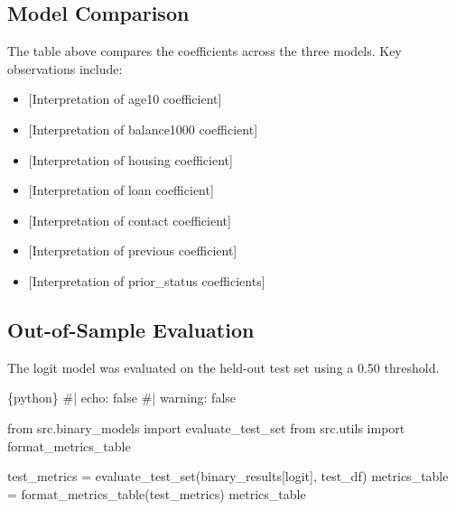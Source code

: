 \documentclass[
  letterpaper,
  DIV=11,
  numbers=noendperiod]{scrartcl}
\newenvironment{Shaded}{\begin{snugshade}}{\end{snugshade}}
\newcommand{\CommentTok}[1]{\textcolor[rgb]{0.37,0.37,0.37}{#1}}
\newcommand{\ImportTok}[1]{\textcolor[rgb]{0.00,0.46,0.62}{#1}}
\newcommand{\InformationTok}[1]{\textcolor[rgb]{0.37,0.37,0.37}{#1}}
\newcommand{\NormalTok}[1]{\textcolor[rgb]{0.00,0.23,0.31}{#1}}
\newcommand{\OperatorTok}[1]{\textcolor[rgb]{0.37,0.37,0.37}{#1}}
\newcommand{\StringTok}[1]{\textcolor[rgb]{0.13,0.47,0.30}{#1}}
\providecommand{\tightlist}{%
  \setlength{\itemsep}{0pt}\setlength{\parskip}{0pt}}
\begin{document}
\subsection{Model Comparison}\label{model-comparison}

The table above compares the coefficients across the three models. Key
observations include:

\begin{itemize}
\tightlist
\item
  {[}Interpretation of age10 coefficient{]}
\item
  {[}Interpretation of balance1000 coefficient{]}
\item
  {[}Interpretation of housing coefficient{]}
\item
  {[}Interpretation of loan coefficient{]}
\item
  {[}Interpretation of contact coefficient{]}
\item
  {[}Interpretation of previous coefficient{]}
\item
  {[}Interpretation of prior\_status coefficients{]}
\end{itemize}

\subsection{Out-of-Sample Evaluation}\label{out-of-sample-evaluation}

The logit model was evaluated on the held-out test set using a 0.50
threshold.

\begin{Shaded}
\begin{Highlighting}[]
\InformationTok{\textasciigrave{}\textasciigrave{}\textasciigrave{}\{python\}}
\CommentTok{\#| echo: false}
\CommentTok{\#| warning: false}

\ImportTok{from}\NormalTok{ src.binary\_models }\ImportTok{import}\NormalTok{ evaluate\_test\_set}
\ImportTok{from}\NormalTok{ src.utils }\ImportTok{import}\NormalTok{ format\_metrics\_table}

\NormalTok{test\_metrics }\OperatorTok{=}\NormalTok{ evaluate\_test\_set(binary\_results[}\StringTok{\textquotesingle{}logit\textquotesingle{}}\NormalTok{], test\_df)}
\NormalTok{metrics\_table }\OperatorTok{=}\NormalTok{ format\_metrics\_table(test\_metrics)}
\NormalTok{metrics\_table}
\InformationTok{\textasciigrave{}\textasciigrave{}\textasciigrave{}}
\end{Highlighting}
\end{Shaded}
\end{document}
